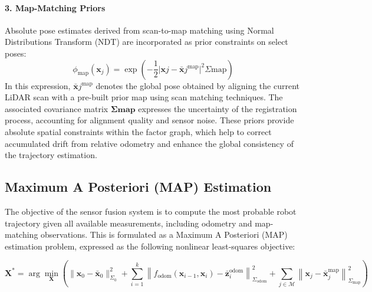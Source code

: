 \paragraph{3. Map-Matching Priors}
Absolute pose estimates derived from scan-to-map matching using Normal Distributions Transform (NDT) are incorporated as prior constraints on select poses:
\begin{equation}
	\phi_{\text{map}}(\mathbf{x}_j) = \exp\left( -\frac{1}{2} | \mathbf{x}j - \bar{\mathbf{x}}j^{\text{map}} |^2{\Sigma{\text{map}}} \right)
\end{equation}
In this expression, $\bar{\mathbf{x}}j^{\text{map}} $  denotes the global pose obtained by aligning the current LiDAR scan with a pre-built prior map using scan matching techniques. The associated covariance matrix $\mathbf{\Sigma{\text{map}}}$ expresses the uncertainty of the registration process, accounting for alignment quality and sensor noise. These priors provide absolute spatial constraints within the factor graph, which help to correct accumulated drift from relative odometry and enhance the global consistency of the trajectory estimation.
\subsection{Maximum A Posteriori (MAP) Estimation}

The objective of the sensor fusion system is to compute the most probable robot trajectory given all available measurements, including odometry and map-matching observations. This is formulated as a Maximum A Posteriori (MAP) estimation problem, expressed as the following nonlinear least-squares objective:

\begin{equation}
	\mathbf{X}^* = \arg\min_{\mathbf{X}} \left(
	\| \mathbf{x}_0 - \bar{\mathbf{x}}_0 \|^2_{\Sigma_0} +
	\sum_{i=1}^{k} \left\| f_{\text{odom}}(\mathbf{x}_{i-1}, \mathbf{x}_i) - \bar{\mathbf{z}}_i^{\text{odom}} \right\|^2_{\Sigma_{\text{odom}}} +
	\sum_{j \in \mathcal{M}} \left\| \mathbf{x}_j - \bar{\mathbf{x}}_j^{\text{map}} \right\|^2_{\Sigma_{\text{map}}}
	\right)
	\label{eq:map-estimation}
\end{equation}

